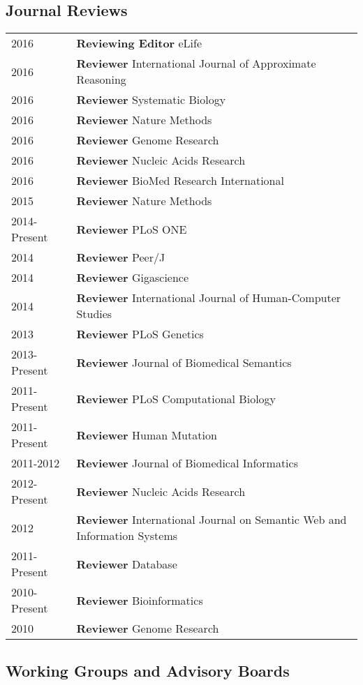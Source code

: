 \documentclass[11pt,fullpage]{article}
\begin{document}
\subsection*{Journal Reviews}

\begin{longtable}{p{0.5in}|p{5.5in}}

  2016 & \textbf{Reviewing Editor} eLife \\
  2016 & \textbf{Reviewer} International Journal of Approximate Reasoning \\
  2016 & \textbf{Reviewer} Systematic Biology \\
  2016 & \textbf{Reviewer} Nature Methods \\
  2016 & \textbf{Reviewer} Genome Research \\
  2016 & \textbf{Reviewer} Nucleic Acids Research \\
  2016 & \textbf{Reviewer} BioMed Research International \\
  2015 & \textbf{Reviewer} Nature Methods \\
  2014-Present & \textbf{Reviewer} PLoS ONE \\
  2014 & \textbf{Reviewer} Peer/J \\
  2014 & \textbf{Reviewer} Gigascience \\
  2014 & \textbf{Reviewer} International Journal of Human-Computer Studies \\
  2013 & \textbf{Reviewer} PLoS Genetics \\
  2013-Present & \textbf{Reviewer} Journal of Biomedical Semantics \\
  2011-Present & \textbf{Reviewer} PLoS Computational Biology \\
  2011-Present & \textbf{Reviewer} Human Mutation \\
  2011-2012 & \textbf{Reviewer} Journal of Biomedical Informatics \\
  2012-Present & \textbf{Reviewer} Nucleic Acids Research \\
  2012 &  \textbf{Reviewer} International Journal on Semantic Web and Information Systems \\
  2011-Present & \textbf{Reviewer} Database \\
  2010-Present & \textbf{Reviewer} Bioinformatics \\
  2010 & \textbf{Reviewer} Genome Research \\


\end{longtable}

\subsection*{Working Groups and Advisory Boards}
\end{document}
